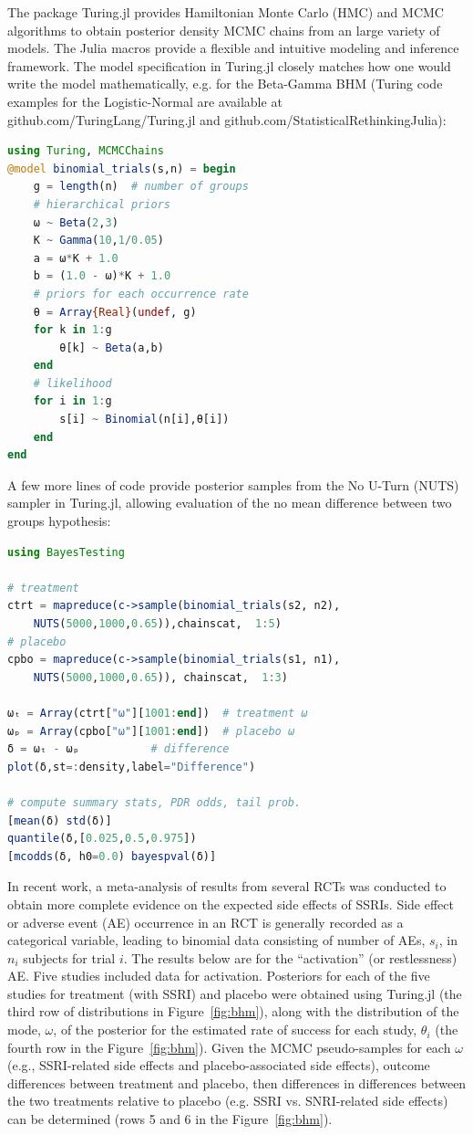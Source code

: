 \documentclass{juliacon}
\begin{document}
\vskip 6pt
The package Turing.jl provides Hamiltonian Monte Carlo (HMC) and MCMC algorithms to obtain posterior density MCMC chains from an large variety of models. The Julia macros provide a flexible and intuitive modeling and inference framework. The model specification in Turing.jl closely matches how one would write the model mathematically, e.g. for the Beta-Gamma BHM (Turing code examples for the Logistic-Normal are available at github.com/TuringLang/Turing.jl and github.com/StatisticalRethinkingJulia):
\begin{lstlisting}[language = Julia]
using Turing, MCMCChains
@model binomial_trials(s,n) = begin
	g = length(n)  # number of groups
	# hierarchical priors
	ω ~ Beta(2,3)
	K ~ Gamma(10,1/0.05)
	a = ω*K + 1.0
	b = (1.0 - ω)*K + 1.0
	# priors for each occurrence rate
	θ = Array{Real}(undef, g)
	for k in 1:g
		θ[k] ~ Beta(a,b)
	end
	# likelihood
	for i in 1:g
		s[i] ~ Binomial(n[i],θ[i])
	end
end
\end{lstlisting}

A few more lines of code provide posterior samples from the No U-Turn (NUTS) sampler in Turing.jl, allowing evaluation of the no mean difference between two groups hypothesis:
\begin{lstlisting}[language = Julia]
using BayesTesting

# treatment
ctrt = mapreduce(c->sample(binomial_trials(s2, n2),
	NUTS(5000,1000,0.65)),chainscat,  1:5)
# placebo
cpbo = mapreduce(c->sample(binomial_trials(s1, n1),
	NUTS(5000,1000,0.65)), chainscat,  1:3)

ωₜ = Array(ctrt["ω"][1001:end])  # treatment ω
ωₚ = Array(cpbo["ω"][1001:end])  # placebo ω
δ = ωₜ - ωₚ           # difference
plot(δ,st=:density,label="Difference")

# compute summary stats, PDR odds, tail prob.
[mean(δ) std(δ)]
quantile(δ,[0.025,0.5,0.975])
[mcodds(δ, h0=0.0) bayespval(δ)]
\end{lstlisting}

In recent work\cite{Mills2019b}, a meta-analysis of results from several RCTs was conducted to obtain more complete evidence on the expected side effects of SSRIs.  Side effect or adverse event (AE) occurrence in an RCT is generally recorded as a categorical variable, leading to binomial data consisting of number of AEs, $s_i$, in $n_i$ subjects for trial $i$. The results below are for the  “activation” (or restlessness) AE.  Five studies included data for activation.  Posteriors for each of the five studies for treatment (with SSRI) and placebo were obtained using Turing.jl (the third row of distributions in Figure~\ref{fig:bhm}), along with the distribution of the mode, $\omega$, of the posterior for the estimated rate of success for each study, $\theta_i$ (the fourth row in the Figure~\ref{fig:bhm}).  Given the MCMC pseudo-samples for each $\omega$ (e.g., SSRI-related side effects and placebo-associated side effects), outcome differences between treatment and placebo, then differences in differences between the two treatments relative to placebo (e.g. SSRI vs. SNRI-related side effects) can be determined (rows 5 and 6 in the Figure~\ref{fig:bhm}).
\vskip 6pt
\end{document}
